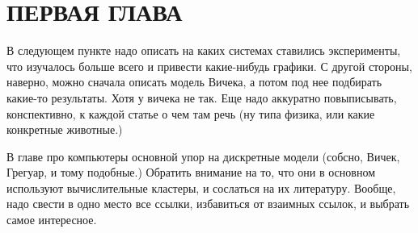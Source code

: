 \chapter{ПЕРВАЯ ГЛАВА} %
\label{cha:chapter_name}
В следующем пункте надо описать на каких системах ставились эксперименты, что изучалось больше всего и привести какие-нибудь графики.
С другой стороны, наверно, можно сначала описать модель Вичека, а потом под нее подбирать какие-то результаты. Хотя у вичека не так.
Еще надо аккуратно повыписывать, конспективно, к каждой статье о чем там речь (ну типа физика, или какие конкретные животные.) \cite{_handling_????}

В главе про компьютеры основной упор на дискретные модели (собсно, Вичек, Грегуар, и тому подобные.) Обратить внимание на то, что они в основном используют вычислительные кластеры, и сослаться на их литературу.
Вообще, надо свести в одно место все ссылки, избавиться от взаимных ссылок, и выбрать самое интересное.


